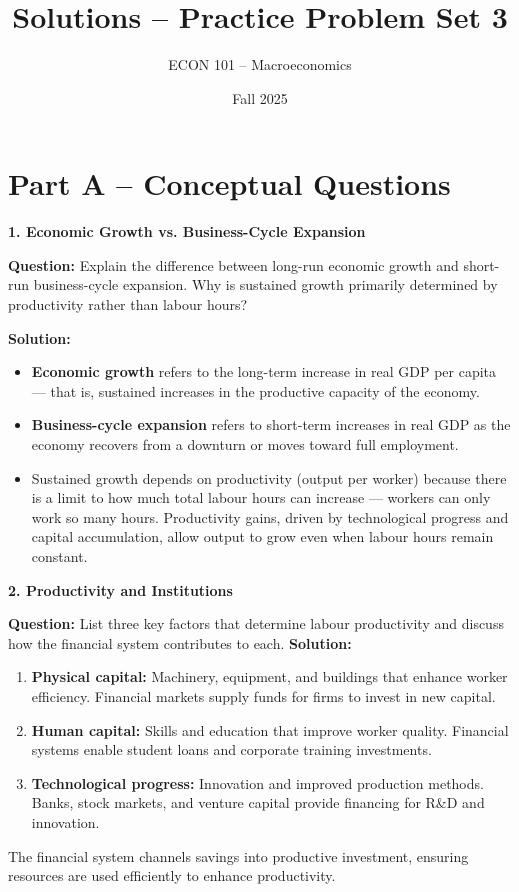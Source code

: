 \documentclass[12pt]{article}
\title{Solutions -- Practice Problem Set 3}
\author{ECON 101 -- Macroeconomics}
\date{Fall 2025}
\begin{document}
\maketitle


\section*{Part A – Conceptual Questions}

\textbf{1. Economic Growth vs. Business-Cycle Expansion}

\textbf{Question:}  
Explain the difference between long-run economic growth and short-run business-cycle expansion. Why is sustained growth primarily determined by productivity rather than labour hours?

\textbf{Solution:}  
\begin{itemize}
\item \textbf{Economic growth} refers to the long-term increase in real GDP per capita — that is, sustained increases in the productive capacity of the economy.
\item \textbf{Business-cycle expansion} refers to short-term increases in real GDP as the economy recovers from a downturn or moves toward full employment.
\item Sustained growth depends on productivity (output per worker) because there is a limit to how much total labour hours can increase — workers can only work so many hours. Productivity gains, driven by technological progress and capital accumulation, allow output to grow even when labour hours remain constant.
\end{itemize}



\textbf{2. Productivity and Institutions}

\textbf{Question:}  
List three key factors that determine labour productivity and discuss how the financial system contributes to each.
\newpage
\textbf{Solution:}  
\begin{enumerate}
    \item \textbf{Physical capital:} Machinery, equipment, and buildings that enhance worker efficiency. Financial markets supply funds for firms to invest in new capital.
    \item \textbf{Human capital:} Skills and education that improve worker quality. Financial systems enable student loans and corporate training investments.
    \item \textbf{Technological progress:} Innovation and improved production methods. Banks, stock markets, and venture capital provide financing for R\&D and innovation.
\end{enumerate}
The financial system channels savings into productive investment, ensuring resources are used efficiently to enhance productivity.
\end{document}
